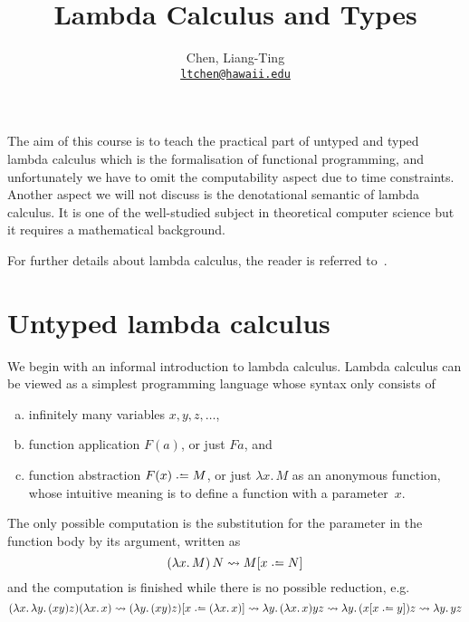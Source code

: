 \title{Lambda Calculus and Types}
\author[L.-T. Chen]{Chen, Liang-Ting\\
  \href{mailto:ltchen@hawaii.edu}{\texttt{ltchen@hawaii.edu}}}

\begin{frame}
\maketitle
\end{frame}

The aim of this course is to teach the practical part of untyped and typed
lambda calculus which is the formalisation of functional programming,
and unfortunately we have to omit the computability aspect due to time
constraints. Another aspect we will not discuss is the denotational semantic of
lambda calculus. It is one of the well-studied subject in theoretical computer
science but it requires a mathematical background.


For further details about lambda calculus, the reader is referred
to~\cite{Barendregt1984,Barendregt1992}. 

\section{Untyped lambda calculus}
We begin with an informal introduction to lambda calculus. Lambda calculus can
be viewed as a simplest programming language whose syntax only consists of
\begin{enumerate}[(a)]
  \item infinitely many variables $x, y, z, \ldots$, 
  \item function application $F(a)$, or just $F a$, and
  \item function abstraction $F(x) \defeq M$, or just $\lambda x.\, M$
    as an anonymous function, whose intuitive meaning is to define a function
    with a parameter~$x$.
\end{enumerate}
The only possible computation is the substitution for the parameter in the
function body by its argument, written as 
\[
  (\lambda x.\, M)\, N \leadsto M\subst{x}{N}
\]
and the computation is finished while there is no possible reduction, e.g.
\[
  (\lambda x.\, \lambda y.\, (x y) z) (\lambda x.\, x)
  \leadsto (\lambda y.\, (x y) z)\subst{x}{(\lambda x.\, x)}
  \leadsto \lambda y.\, (\lambda x.\, x) y z
  \leadsto \lambda y.\, (x\subst{x}{y}) z
  \leadsto \lambda y.\, y z
\]

